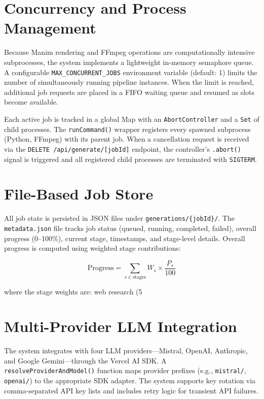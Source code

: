 \documentclass[12pt,a4paper,twoside,openright]{report}
\begin{document}
\section{Concurrency and Process Management}

Because Manim rendering and FFmpeg operations are computationally intensive subprocesses, the system implements a lightweight in-memory semaphore queue. A configurable \texttt{MAX\_CONCURRENT\_JOBS} environment variable (default: 1) limits the number of simultaneously running pipeline instances. When the limit is reached, additional job requests are placed in a FIFO waiting queue and resumed as slots become available.

Each active job is tracked in a global Map with an \texttt{AbortController} and a \texttt{Set} of child processes. The \texttt{runCommand()} wrapper registers every spawned subprocess (Python, FFmpeg) with its parent job. When a cancellation request is received via the \texttt{DELETE /api/generate/[jobId]} endpoint, the controller's \texttt{.abort()} signal is triggered and all registered child processes are terminated with \texttt{SIGTERM}.

\section{File-Based Job Store}

All job state is persisted in JSON files under \texttt{generations/\{jobId\}/}. The \texttt{metadata.json} file tracks job status (queued, running, completed, failed), overall progress (0--100\%), current stage, timestamps, and stage-level details. Overall progress is computed using weighted stage contributions:

\begin{equation}
\text{Progress} = \sum_{s \in \text{stages}} W_s \times \frac{P_s}{100}
\end{equation}

where the stage weights are: web research (5%

\section{Multi-Provider LLM Integration}

The system integrates with four LLM providers---Mistral, OpenAI, Anthropic, and Google Gemini---through the Vercel AI SDK. A \texttt{resolveProviderAndModel()} function maps provider prefixes (e.g., \texttt{mistral/}, \texttt{openai/}) to the appropriate SDK adapter. The system supports key rotation via comma-separated API key lists and includes retry logic for transient API failures.
\end{document}
